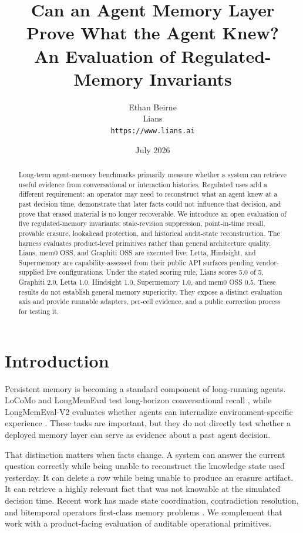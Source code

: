 \documentclass[10pt]{article}
\title{Can an Agent Memory Layer Prove What the Agent Knew?\\
An Evaluation of Regulated-Memory Invariants}
\author{Ethan Beirne\\Lians\\\texttt{https://www.lians.ai}}
\date{July 2026}
\begin{document}
\maketitle

\begin{abstract}
Long-term agent-memory benchmarks primarily measure whether a system can retrieve
useful evidence from conversational or interaction histories. Regulated uses add a
different requirement: an operator may need to reconstruct what an agent knew at a
past decision time, demonstrate that later facts could not influence that decision,
and prove that erased material is no longer recoverable. We introduce an open
evaluation of five regulated-memory invariants: stale-revision suppression,
point-in-time recall, provable erasure, lookahead protection, and historical
audit-state reconstruction. The harness evaluates product-level primitives rather
than general architecture quality. Lians, mem0 OSS, and Graphiti OSS are executed
live; Letta, Hindsight, and Supermemory are capability-assessed from their public API
surfaces pending vendor-supplied live configurations. Under the stated scoring rule,
Lians scores 5.0 of 5, Graphiti 2.0, Letta 1.0, Hindsight 1.0, Supermemory 1.0, and
mem0 OSS 0.5. These results do not establish general memory superiority. They expose
a distinct evaluation axis and provide runnable adapters, per-cell evidence, and a
public correction process for testing it.
\end{abstract}

\section{Introduction}

Persistent memory is becoming a standard component of long-running agents.
LoCoMo and LongMemEval test long-horizon conversational recall
\cite{locomo2024,longmemeval2024}, while LongMemEval-V2 evaluates whether agents can
internalize environment-specific experience \cite{longmemevalv2_2026}. These tasks
are important, but they do not directly test whether a deployed memory layer can
serve as evidence about a past agent decision.

That distinction matters when facts change. A system can answer the current question
correctly while being unable to reconstruct the knowledge state used yesterday. It
can delete a row while being unable to produce an erasure artifact. It can retrieve a
highly relevant fact that was not knowable at the simulated decision time. Recent
work has made state coordination, contradiction resolution, and bitemporal operators
first-class memory problems \cite{toki2026,worlddb2026,atma2026}. We complement that
work with a product-facing evaluation of auditable operational primitives.
\end{document}
